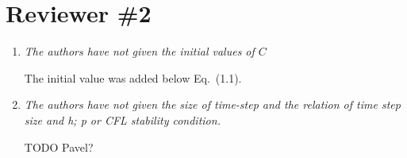 \documentclass[mathpazo]{cicp}
\begin{document}
\section{Reviewer \#2}

\begin{enumerate}

\item \emph{The authors have not given the initial values of $C$}

The initial value was added below Eq.~(1.1).

\item \emph{The authors have not given the size of time-step and the relation
of time step size and h; p or CFL stability condition.}

TODO Pavel?

\end{enumerate}
\end{document}
